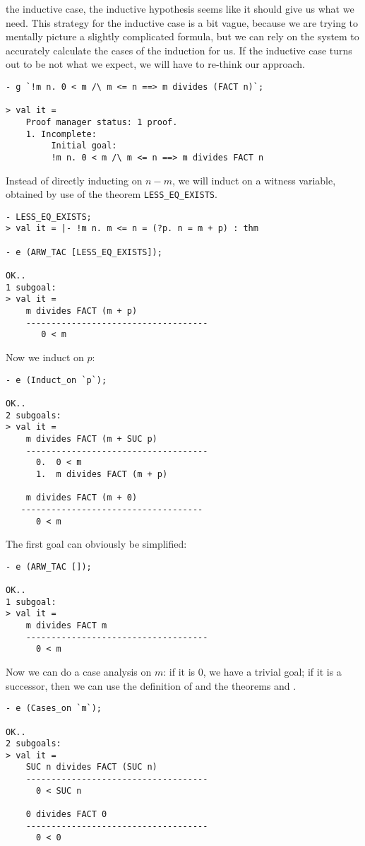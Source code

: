the inductive case, the inductive hypothesis seems like it should give
us what we need. This strategy for the inductive case is a bit vague,
because we are trying to mentally picture a slightly complicated
formula, but we can rely on the system to accurately calculate the
cases of the induction for us. If the inductive case turns out to be
not what we expect, we will have to re-think our approach.
\begin{session}\begin{verbatim}
- g `!m n. 0 < m /\ m <= n ==> m divides (FACT n)`;

> val it =
    Proof manager status: 1 proof.
    1. Incomplete:
         Initial goal:
         !m n. 0 < m /\ m <= n ==> m divides FACT n
\end{verbatim}\end{session}
Instead of directly inducting on $n-m$, we will induct on a witness
variable, obtained by use of the theorem \verb+LESS_EQ_EXISTS+.
\begin{session}\begin{verbatim}
- LESS_EQ_EXISTS;
> val it = |- !m n. m <= n = (?p. n = m + p) : thm

- e (ARW_TAC [LESS_EQ_EXISTS]);

OK..
1 subgoal:
> val it =
    m divides FACT (m + p)
    ------------------------------------
       0 < m
\end{verbatim}\end{session}
\noindent Now we induct on $p$:
\begin{session}\begin{verbatim}
- e (Induct_on `p`);

OK..
2 subgoals:
> val it =
    m divides FACT (m + SUC p)
    ------------------------------------
      0.  0 < m
      1.  m divides FACT (m + p)

    m divides FACT (m + 0)
   ------------------------------------
      0 < m
\end{verbatim}\end{session}
\noindent The first goal can obviously be simplified:
\begin{session}\begin{verbatim}
- e (ARW_TAC []);

OK..
1 subgoal:
> val it =
    m divides FACT m
    ------------------------------------
      0 < m
\end{verbatim}\end{session}
\noindent Now we can do a case analysis on $m$: if it is $0$, we have a
trivial goal; if it is a successor, then we can use the definition of
 and the theorems  and
.
\begin{session}\begin{verbatim}
- e (Cases_on `m`);

OK..
2 subgoals:
> val it =
    SUC n divides FACT (SUC n)
    ------------------------------------
      0 < SUC n

    0 divides FACT 0
    ------------------------------------
      0 < 0
\end{verbatim}\end{session}

